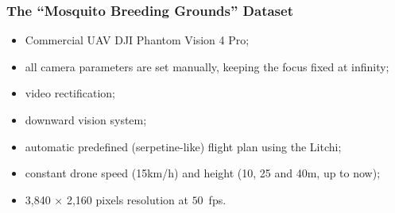 \documentclass{beamer}
\begin{document}
		\begin{frame}\frametitle{The ``Mosquito Breeding Grounds'' Dataset}

			\begin{itemize}
				\item Commercial UAV DJI Phantom Vision 4 Pro;
				\item all camera parameters are set manually, keeping the focus fixed at infinity;
				\item video rectification;
				\item downward vision system;
				\item automatic predefined  (serpetine-like) flight plan using the Litchi;
				\item constant drone speed (15km/h) and height (10, 25 and 40m, up to now);
				\item 3,840 $\times$ 2,160 pixels resolution at  $50$~fps.
			\end{itemize}


		\end{frame}
\end{document}
